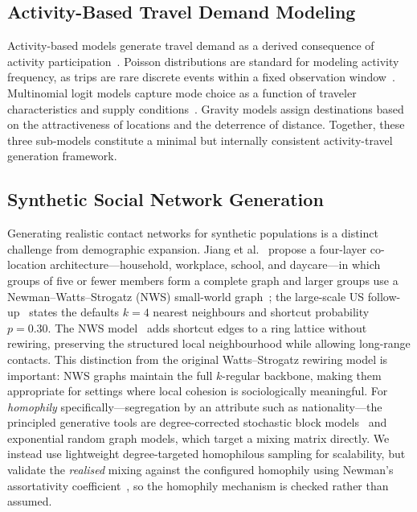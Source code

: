 \documentclass[a4paper,12pt]{article}
\begin{document}
\subsection{Activity-Based Travel Demand Modeling}

Activity-based models generate travel demand as a derived consequence of
activity participation~\cite{bhat1999activity,arentze2000albatross}.
Poisson distributions are standard for modeling activity frequency, as
trips are rare discrete events within a fixed observation
window~\cite{arentze2000albatross}. Multinomial logit models capture
mode choice as a function of traveler characteristics and supply
conditions~\cite{ben1985discrete}. Gravity models assign destinations
based on the attractiveness of locations and the deterrence of distance.
Together, these three sub-models constitute a minimal but internally
consistent activity-travel generation framework.

\subsection{Synthetic Social Network Generation}
\label{subsec:related_networks}

Generating realistic contact networks for synthetic populations is a
distinct challenge from demographic expansion. Jiang et al.~\cite{jiang2022synthetic}
propose a four-layer co-location architecture---household, workplace, school, and
daycare---in which groups of five or fewer members form a complete graph and larger
groups use a Newman--Watts--Strogatz (NWS) small-world
graph~\cite{newman1999renormalization}; the large-scale US follow-up~\cite{jiang2024large}
states the defaults $k = 4$ nearest neighbours and shortcut probability $p = 0.30$.
The NWS model~\cite{watts1998collective} adds shortcut edges to a ring lattice without
rewiring, preserving the structured local neighbourhood while allowing long-range
contacts. This distinction from the original Watts--Strogatz rewiring model is
important: NWS graphs maintain the full $k$-regular backbone, making them appropriate
for settings where local cohesion is sociologically meaningful. For \emph{homophily}
specifically---segregation by an attribute such as nationality---the principled
generative tools are degree-corrected stochastic block models~\cite{newman2003mixing}
and exponential random graph models, which target a mixing matrix directly. We instead
use lightweight degree-targeted homophilous sampling for scalability, but validate the
\emph{realised} mixing against the configured homophily using Newman's assortativity
coefficient~\cite{newman2003mixing}, so the homophily mechanism is checked rather than
assumed.
\end{document}
